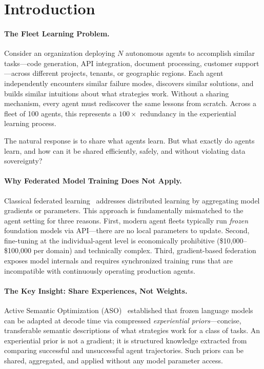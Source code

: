 \section{Introduction}

\label{sec:intro}

\paragraph{The Fleet Learning Problem.}
Consider an organization deploying $N$ autonomous agents to accomplish similar
tasks---code generation, API integration, document processing, customer
support---across different projects, tenants, or geographic regions. Each
agent independently encounters similar failure modes, discovers similar
solutions, and builds similar intuitions about what strategies work. Without a
sharing mechanism, every agent must rediscover the same lessons from scratch.
Across a fleet of 100 agents, this represents a $100\times$ redundancy in the
experiential learning process.

The natural response is to share what agents learn. But what exactly do agents
learn, and how can it be shared efficiently, safely, and without violating data
sovereignty?

\paragraph{Why Federated Model Training Does Not Apply.}
Classical federated learning~\cite{mcmahan2017communication} addresses
distributed learning by aggregating model gradients or parameters. This
approach is fundamentally mismatched to the agent setting for three reasons.
First, modern agent fleets typically run \emph{frozen} foundation models via
API---there are no local parameters to update. Second, fine-tuning at the
individual-agent level is economically prohibitive (\$10{,}000--\$100{,}000 per
domain) and technically complex. Third, gradient-based federation exposes model
internals and requires synchronized training runs that are incompatible with
continuously operating production agents.

\paragraph{The Key Insight: Share Experiences, Not Weights.}
Active Semantic Optimization (ASO)~\cite{hanzo2026aso} established that
frozen language models can be adapted at decode time via compressed
\emph{experiential priors}---concise, transferable semantic descriptions of
what strategies work for a class of tasks. An experiential prior is not a
gradient; it is structured knowledge extracted from comparing successful and
unsuccessful agent trajectories. Such priors can be shared, aggregated, and
applied without any model parameter access.

